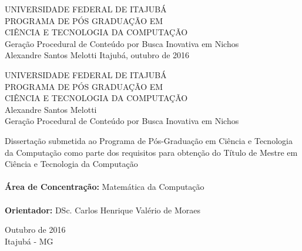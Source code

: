 \begin{titlepage}
    \begin{center}
        {\normalsize UNIVERSIDADE FEDERAL DE ITAJUBÁ} \\[0.5cm]
        {\normalsize PROGRAMA DE PÓS GRADUAÇÃO EM} \\
        {\normalsize CIÊNCIA E TECNOLOGIA DA COMPUTAÇÃO} \\[7.0cm]
        {\Large Geração Procedural de Conteúdo por Busca Inovativa em Nichos} \\[4.0cm]
        {\large Alexandre Santos Melotti}
        \vfill
        {\normalsize Itajubá, outubro de 2016}
    \end{center}
\end{titlepage}

\begin{titlepage}
    \begin{center}
        {\normalsize UNIVERSIDADE FEDERAL DE ITAJUBÁ} \\
        {\normalsize PROGRAMA DE PÓS GRADUAÇÃO EM} \\
        {\normalsize CIÊNCIA E TECNOLOGIA DA COMPUTAÇÃO} \\[3.3cm]
        {\large Alexandre Santos Melotti} \\[3.3cm]
        {\Large Geração Procedural de Conteúdo por Busca Inovativa em Nichos} \\[5.0cm]
        \begin{flushright}
        \begin{minipage}{.70\textwidth}
            \begin{espacosimples}
                Dissertação submetida ao Programa de Pós-Graduação em Ciência e Tecnologia da Computação
                como parte dos requisitos para obtenção do Título de Mestre em Ciência e Tecnologia da Computação \\ \\
                \textbf{Área de Concentração:} Matemática da Computação \\ \\
                \textbf{Orientador:} DSc. Carlos Henrique Valério de Moraes
            \end{espacosimples}
        \end{minipage}
        \end{flushright}
        \vfill
        {\normalsize Outubro de 2016} \\
        {\normalsize Itajubá - MG}
    \end{center}
\end{titlepage}
